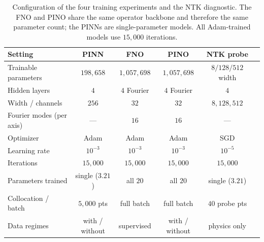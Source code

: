 \begin{table}[htbp]
    \centering
    \caption{Configuration of the four training experiments and the NTK diagnostic. The FNO and PINO share the same operator backbone and therefore the same parameter count; the PINNs are single-parameter models. All Adam-trained models use $15{,}000$ iterations.}
    \label{tab:hyperparams}
    \small
    \begin{tabular}{lccccc}
        \hline
        \textbf{Setting} & \textbf{PINN} & \textbf{FNO} & \textbf{PINO} & \textbf{NTK probe} \\
        \hline
        Trainable parameters      & $198{,}658$ & $1{,}057{,}698$ & $1{,}057{,}698$ & $8/128/512$ width \\
        Hidden layers             & $4$         & $4$ Fourier     & $4$ Fourier     & $4$ \\
        Width / channels          & $256$       & $32$            & $32$            & $8,128,512$ \\
        Fourier modes (per axis)  & ---         & $16$            & $16$            & --- \\
        Optimizer                 & Adam        & Adam            & Adam            & SGD \\
        Learning rate             & $10^{-3}$   & $10^{-3}$       & $10^{-3}$       & $10^{-5}$ \\
        Iterations                & $15{,}000$  & $15{,}000$      & $15{,}000$      & $15{,}000$ \\
        Parameters trained        & single ($3.21$) & all $20$    & all $20$        & single ($3.21$) \\
        Collocation / batch       & $5{,}000$ pts & full batch     & full batch     & $40$ probe pts \\
        Data regimes              & with / without & supervised   & with / without & physics only \\
        \hline
    \end{tabular}
    \\[0.4em]
    \autoriapropria
\end{table}
